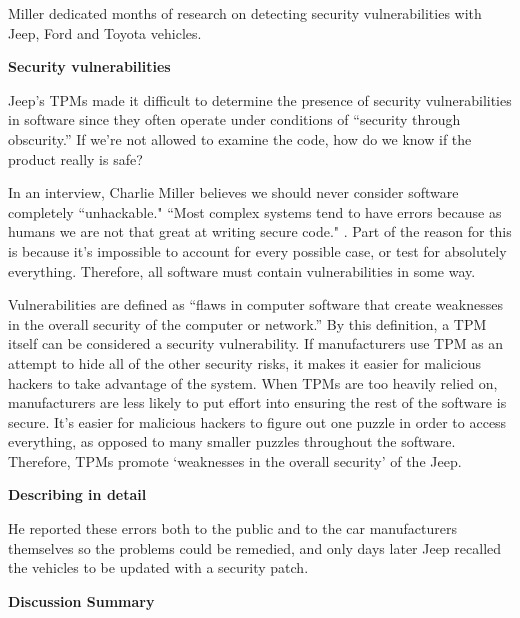 \documentclass[12pt]{article}
\begin{document}
\begin{multicols}{2}
Miller dedicated months of research on detecting security vulnerabilities with Jeep, Ford and Toyota vehicles.\cite{officialPaper}

\vspace{.5cm}\hspace{-.5cm}\textbf{Security vulnerabilities}\vspace{.2cm}

Jeep's TPMs made it difficult to determine the presence of security vulnerabilities in software since they often operate under conditions of ``security through obscurity.'' \cite{chris} If we're not allowed to examine the code, how do we know if the product really is safe?

In an interview, Charlie Miller believes we should never consider software completely ``unhackable."\cite{unhackableInterview}\cite{youtube} ``Most complex systems tend to have errors because as humans we are not that great at writing secure code." \cite{unhackableInterview}. Part of the reason for this is because it's impossible to account for every possible case, or test for absolutely everything. \cite {turner} Therefore, all software must contain vulnerabilities in some way.

Vulnerabilities are defined as ``flaws in computer software that create weaknesses in the overall security of the computer or network.''\cite{norton} By this definition, a TPM itself  can be considered a security vulnerability. If manufacturers use TPM as an attempt to hide all of the other security risks, it makes it easier for malicious hackers to take advantage of the system. When TPMs are too heavily relied on, manufacturers are  less likely to put effort into ensuring the rest of the software is secure. \cite{turner} 
It's easier for malicious hackers to figure out one puzzle in order to access everything, as opposed to many smaller puzzles throughout the software. Therefore, TPMs promote `weaknesses in the overall security' of the Jeep.

\vspace{.5cm}\hspace{-.5cm}\textbf{Describing in detail}\vspace{.2cm}

He reported these errors both to the public and to the car manufacturers themselves so the problems could be remedied, and only days later Jeep recalled the vehicles to be updated with a security patch.\cite{recall}

\vspace{.5cm}\hspace{-.5cm}\textbf{Discussion Summary}\vspace{.2cm}



\end{multicols}
\end{document}
